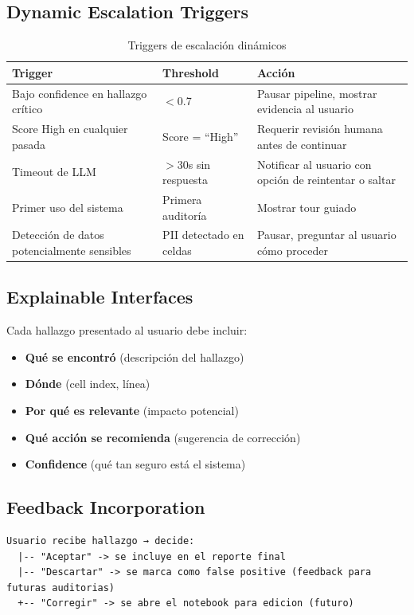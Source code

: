 \documentclass[12pt,a4paper]{article}
\begin{document}
\subsection*{Dynamic Escalation Triggers}
\begin{table}[h]
\centering
\begin{tabular}{p{} p{} p{}}
\toprule
\textbf{Trigger} & \textbf{Threshold} & \textbf{Acción} \\
\midrule
Bajo confidence en hallazgo crítico  & $<$0.7 & Pausar pipeline, mostrar evidencia al usuario \\
Score High en cualquier pasada      & Score = ``High'' & Requerir revisión humana antes de continuar \\
Timeout de LLM                     & $>$30s sin respuesta & Notificar al usuario con opción de reintentar o saltar \\
Primer uso del sistema             & Primera auditoría  & Mostrar tour guiado \\
Detección de datos potencialmente sensibles & PII detectado en celdas & Pausar, preguntar al usuario cómo proceder \\
\bottomrule
\end{tabular}
\caption{Triggers de escalación dinámicos}
\end{table}

\subsection*{Explainable Interfaces}
Cada hallazgo presentado al usuario debe incluir:
\begin{itemize}
  \item \textbf{Qué se encontró} (descripción del hallazgo)
  \item \textbf{Dónde} (cell index, línea)
  \item \textbf{Por qué es relevante} (impacto potencial)
  \item \textbf{Qué acción se recomienda} (sugerencia de corrección)
  \item \textbf{Confidence} (qué tan seguro está el sistema)
\end{itemize}

\subsection*{Feedback Incorporation}
\begin{verbatim}
Usuario recibe hallazgo → decide:
  |-- "Aceptar" -> se incluye en el reporte final
  |-- "Descartar" -> se marca como false positive (feedback para futuras auditorias)
  +-- "Corregir" -> se abre el notebook para edicion (futuro)
\end{verbatim}
\end{document}
